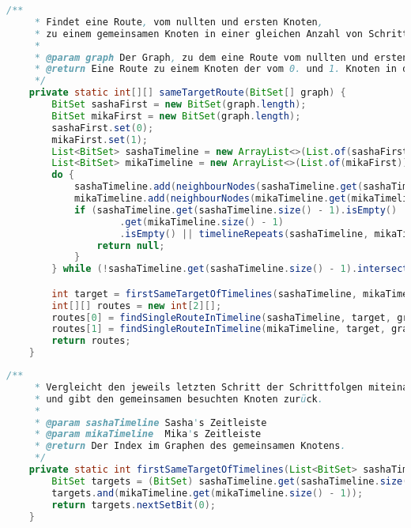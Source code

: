 \documentclass[a4paper,10pt,ngerman]{scrartcl}
\begin{document}
    \begin{lstlisting}[frame=single,language=Java,title=Methode sameTargetRoute,breaklines=true]
    /**
     * Findet eine Route, vom nullten und ersten Knoten,
     * zu einem gemeinsamen Knoten in einer gleichen Anzahl von Schritten.
     *
     * @param graph Der Graph, zu dem eine Route vom nullten und ersten Knoten zu einem gemeinsamen Knoten gebildet werden soll.
     * @return Eine Route zu einem Knoten der vom 0. und 1. Knoten in der gleichen Anzahl von Schritten erreichbar ist.
     */
    private static int[][] sameTargetRoute(BitSet[] graph) {
        BitSet sashaFirst = new BitSet(graph.length);
        BitSet mikaFirst = new BitSet(graph.length);
        sashaFirst.set(0);
        mikaFirst.set(1);
        List<BitSet> sashaTimeline = new ArrayList<>(List.of(sashaFirst));
        List<BitSet> mikaTimeline = new ArrayList<>(List.of(mikaFirst));
        do {
            sashaTimeline.add(neighbourNodes(sashaTimeline.get(sashaTimeline.size() - 1), graph));
            mikaTimeline.add(neighbourNodes(mikaTimeline.get(mikaTimeline.size() - 1), graph));
            if (sashaTimeline.get(sashaTimeline.size() - 1).isEmpty() || mikaTimeline
                    .get(mikaTimeline.size() - 1)
                    .isEmpty() || timelineRepeats(sashaTimeline, mikaTimeline)) {
                return null;
            }
        } while (!sashaTimeline.get(sashaTimeline.size() - 1).intersects(mikaTimeline.get(mikaTimeline.size() - 1)));

        int target = firstSameTargetOfTimelines(sashaTimeline, mikaTimeline);
        int[][] routes = new int[2][];
        routes[0] = findSingleRouteInTimeline(sashaTimeline, target, graph);
        routes[1] = findSingleRouteInTimeline(mikaTimeline, target, graph);
        return routes;
    }
    \end{lstlisting}


    \begin{lstlisting}[frame=single,language=Java,title=Methode firstSameTargetOfTimelines,breaklines=true]
    /**
     * Vergleicht den jeweils letzten Schritt der Schrittfolgen miteinander
     * und gibt den gemeinsamen besuchten Knoten zurück.
     *
     * @param sashaTimeline Sasha's Zeitleiste
     * @param mikaTimeline  Mika's Zeitleiste
     * @return Der Index im Graphen des gemeinsamen Knotens.
     */
    private static int firstSameTargetOfTimelines(List<BitSet> sashaTimeline, List<BitSet> mikaTimeline) {
        BitSet targets = (BitSet) sashaTimeline.get(sashaTimeline.size() - 1).clone();
        targets.and(mikaTimeline.get(mikaTimeline.size() - 1));
        return targets.nextSetBit(0);
    }
    \end{lstlisting}
\end{document}
